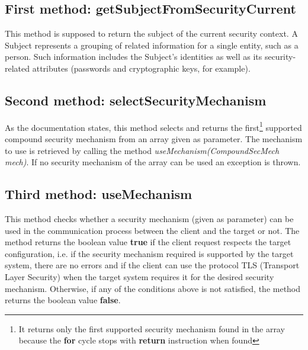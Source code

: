 \documentclass[\mainpath/main]{subfiles}
\begin{document}
\subsection{First method: getSubjectFromSecurityCurrent}
\label{Assignment:AssignedMethods:FirstMethod}
This method is supposed to return the subject of the current security context. A Subject represents a grouping of related information for a single entity, such as a person. Such information includes the Subject's identities as well as its security-related attributes (passwords and cryptographic keys, for example).

\subsection{Second method: selectSecurityMechanism}
\label{Assignment:AssignedMethods:SecondMethod}
As the documentation states, this method selects and returns the first\footnote{It returns only the first supported security mechanism found in the array because the \textbf{\color{javapurple} for} cycle stops with \textbf{\color{javapurple} return} instruction when found} supported compound security mechanism from an array given as parameter. The mechanism to use is retrieved by calling the method \textit{useMechanism(CompoundSecMech mech)}. If no security mechanism of the array can be used an exception is thrown.

\subsection{Third method: useMechanism}
\label{Assignment:AssignedMethods:ThirdMethod}
This method checks whether a security mechanism (given as parameter) can be used in the communication process between the client and the target or not. The method returns the boolean value \textbf{\color{javapurple} true} if the client request respects the target configuration, i.e. if the security mechanism required is supported by the target system, there are no errors and if the client can use the protocol TLS (Transport Layer Security) when the target system requires it for the desired security mechanism. Otherwise, if any of the conditions above is not satisfied, the method returns the boolean value \textbf{\color{javapurple} false}.

\clearpage
\end{document}

